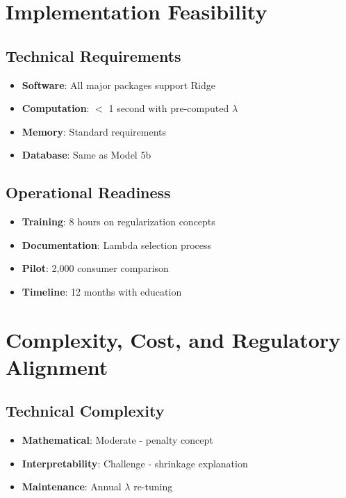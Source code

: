 \section{Implementation Feasibility}

\subsection{Technical Requirements}

\begin{itemize}
    \item \textbf{Software}: All major packages support Ridge
    \item \textbf{Computation}: $<$ 1 second with pre-computed $\lambda$
    \item \textbf{Memory}: Standard requirements
    \item \textbf{Database}: Same as Model 5b
\end{itemize}

\subsection{Operational Readiness}

\begin{itemize}
    \item \textbf{Training}: 8 hours on regularization concepts
    \item \textbf{Documentation}: Lambda selection process
    \item \textbf{Pilot}: 2,000 consumer comparison
    \item \textbf{Timeline}: 12 months with education
\end{itemize}

\section{Complexity, Cost, and Regulatory Alignment}

\subsection{Technical Complexity}

\begin{itemize}
    \item \textbf{Mathematical}: Moderate - penalty concept
    \item \textbf{Interpretability}: Challenge - shrinkage explanation
    \item \textbf{Maintenance}: Annual $\lambda$ re-tuning
\end{itemize}

